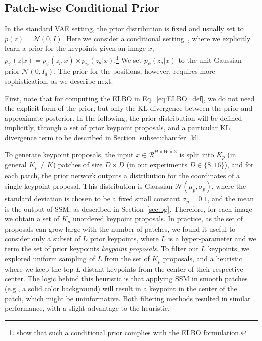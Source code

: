 \documentclass[nohyperref]{article}
\theoremstyle{plain}
\theoremstyle{definition}
\theoremstyle{remark}
\begin{document}
\vspace{-3em}
\subsection{Patch-wise Conditional Prior}
In the standard VAE setting, the prior distribution is fixed and usually set to $p(z) = \mathcal{N}(0, I)$. Here we consider a conditional setting~\citep{Sohn2015cvae}, where we explicitly learn a prior for the keypoints given an image $x$, $p_{\psi}(z|x) = p_{\psi}(z_p|x)\times p_{\psi}(z_a|x)$.\footnote{ \citet{Sohn2015cvae} show that such a conditional prior complies with the ELBO formulation.} We set $p_{\psi}(z_a|x)$ to the unit Gaussian prior $\mathcal{N}(0, I_d)$. The prior for the positions, however, requires more sophistication, as we describe next.

First, note that for computing the ELBO in Eq.~\eqref{eq:ELBO_def}, we do not need the explicit form of the prior, but only the KL divergence between the prior and approximate posterior. In the following, the prior distribution will be defined implicitly, through a set of prior keypoint proposals, and a particular KL divergence term to be described in Section \ref{subsec:chamfer_kl}.

To generate keypoint proposals, 
the input $x \in \mathcal{R}^{H \times W \times 3}$ is split into $K_p$ (in general $K_p\neq K$) patches of size $D \times D$ (in our experiments $D\in\{8, 16\}$), and for each patch, the prior network outputs a distribution for the coordinates of a single keypoint proposal. This distribution is Gaussian $\mathcal{N}(\mu_p, \sigma_p)$, where the standard deviation is chosen to be a fixed small constant $\sigma_p=0.1$, and the mean is the output of SSM, as described in Section~\ref{sec:bg}.
Therefore, for each image we obtain a set of $K_p$ unordered keypoint proposals.
In practice, as the set of proposals can grow large with the number of patches, we found it useful to consider only a subset of $L$ prior keypoints, where $L$ is a hyper-parameter and we term the set of prior keypoints \textit{keypoint proposals}. To filter out $L$ keypoints, we explored uniform sampling of $L$ from the set of $K_p$ proposals, and a heuristic where we keep the top-$L$ distant keypoints from the center of their respective center. The logic behind this heuristic is that applying SSM in smooth patches (e.g., a solid color background) will result in a keypoint in the center of the patch, which might be uninformative. Both filtering methods resulted in similar performance, with a slight advantage to the heuristic. 
\end{document}
